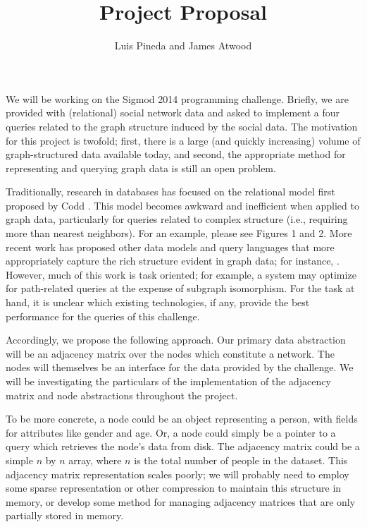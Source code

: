 \documentclass{article}
\title{Project Proposal}
\author{
Luis Pineda and James Atwood \\
}
\begin{document}
\maketitle

We will be working on the Sigmod 2014 programming challenge.  Briefly, we are provided with (relational) social network data and asked to implement a four queries related to the graph structure induced by the social data.  The motivation for this project is twofold; first, there is a large (and quickly increasing) volume of graph-structured data available today, and second, the appropriate method for representing and querying graph data is still an open problem.

Traditionally, research in databases has focused on the relational model first proposed by Codd \cite{coddpaper}.  This model becomes awkward and inefficient when applied to graph data, particularly for queries related to complex structure (i.e., requiring more than nearest neighbors).  For an example, please see \cite{GraphQL paper} Figures 1 and 2.  More recent work has proposed other data models and query languages that more appropriately capture the rich structure evident in graph data; for instance, \cite{GraphQL paper,neo4j_paper,graphlab paper}.  However, much of this work is task oriented; for example, a system may optimize for path-related queries at the expense of subgraph isomorphism.  For the task at hand, it is unclear which existing technologies, if any, provide the best performance for the queries of this challenge.

Accordingly, we propose the following approach.  Our primary data abstraction will be an adjacency matrix over the nodes which constitute a network.  The nodes will themselves be an interface for the data provided by the challenge.  We will be investigating the particulars of the implementation of the adjacency matrix and node abstractions throughout the project.

To be more concrete, a node could be an object representing a person, with fields for attributes like gender and age.  Or, a node could simply be a pointer to a query which retrieves the node's data from disk.  The adjacency matrix could be a simple $n$ by $n$ array, where $n$ is the total number of people in the dataset.  This adjacency matrix representation scales poorly; we will probably need to employ some sparse representation or other compression to maintain this structure in memory, or develop some method for managing adjacency matrices that are only partially stored in memory.
\end{document}
